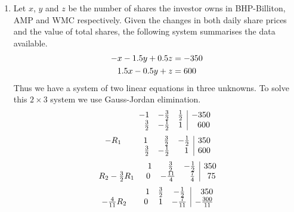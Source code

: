 \documentclass[12pt]{amsart}
\begin{document}
\begin{enumerate}
	\item Let $x$, $y$ and $z$ be the number of shares the investor owns in BHP-Billiton, AMP and WMC 
		respectively. Given the changes in both daily share prices and the value  of total shares, the 				following system summarises the data available.
		\begin{align}
			-x-1.5y+0.5z&=-350 \notag \\
			1.5x-0.5y+z&=600 \notag 
		\end{align}
		Thus we have a system of two linear equations in three unknowns. To solve this $2 \times 3$ 				system we use Gauss-Jordan elimination.
		\begin{align}
			\begin{array}{ccc|c}
				\hspace{1.5cm} -1 &-\frac{3}{2} &\frac{1}{2} &-350 \\
				\hspace{1.5cm} \text{ } \text{ }\frac{3}{2} &-\frac{1}{2} & 1 &\text{ } \text{ } 600 
			\end{array} \notag
		\end{align} 
		\begin{align}
			\begin{array}{ccc|c}
				-R_1 \hspace{0.7cm} \text{ } \text{ }1 & \text{ } \text{ } \frac{3}{2} &-\frac{1}{2} &350 \\
				\hspace{1.5cm} \text{ } \text{ }\frac{3}{2} &-\frac{1}{2} & \text{ } \text{ }1 &600 
			\end{array} \notag
		\end{align} 
		\begin{align}
			\begin{array}{ccc|c}
				\hspace{1.9cm} \text{ } \text{ }1 & \text{ } \text{ } \frac{3}{2} &-\frac{1}{2} &350 \\
				R_2-\frac{3}{2}R_1 \hspace{0.5cm} 0 &-\frac{11}{4} & \text{ } \text{ }\frac{7}{4} & \text{ } 75 
			\end{array} \notag
		\end{align} 
		\begin{align}
			\begin{array}{ccc|c}
				\hspace{1.7cm} \text{ } \text{ }1 &\frac{3}{2} &-\frac{1}{2} & \text{ } \text{ } 350 \\
				-\frac{4}{11}R_2 \hspace{0.5cm} \text{ } \text{ } 0 &1 &-\frac{7}{11} &-\frac{300}{11} 

\end{array}
\end{align}
\end{enumerate}
\end{document}
